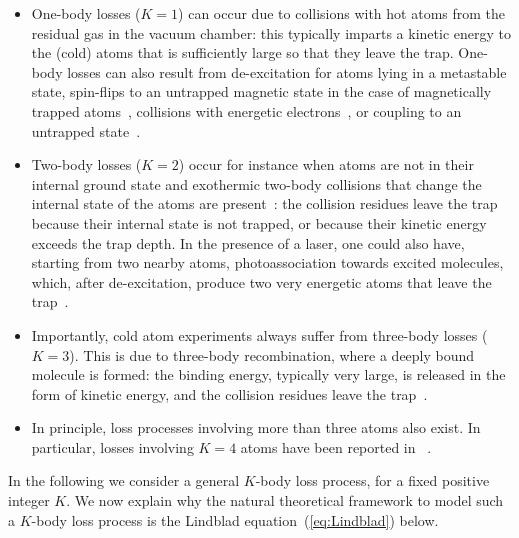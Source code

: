 \documentclass[onecolumn,amsfonts,showpacs,superscriptaddress]{revtex4-1}
\begin{document}
\begin{itemize}
\item One-body losses ($K=1$) can occur due to collisions with hot atoms from the residual gas in the vacuum chamber: this typically imparts a kinetic energy to the (cold) atoms that is sufficiently large so that they leave the trap.  
One-body losses can also result from de-excitation for atoms lying in a metastable state, spin-flips to an untrapped magnetic state in the case of magnetically trapped atoms~\citep{burrows_nonadiabatic_2017},
collisions with energetic electrons~\citep{labouvie_bistability_2016}, or 
coupling to an untrapped state~\citep{rauer_cooling_2016,bouchoule_asymptotic_2020}.


\item Two-body losses ($K=2$) occur for instance when atoms are not in their internal ground state and exothermic two-body collisions that change the internal state of the atoms are present~\citep{traverso_inelastic_2009,yamaguchi_inelastic_2008}: the collision residues leave the trap because their internal state is not trapped, or because their kinetic energy exceeds the trap depth. In the presence of a laser, one could also have, starting from two nearby atoms, photoassociation towards excited molecules, which, after de-excitation, produce two very energetic atoms that leave the trap~\citep{kinoshita_local_2005}.

\item Importantly, cold atom experiments always suffer from three-body losses ($K=3$). This is due to three-body recombination, where a 
deeply bound molecule is formed: the binding energy, typically very large, is released in the form of kinetic energy, and the collision residues leave the trap~\citep{soding_three-body_1999,tolra_observation_2004}. 

\item In principle, loss processes involving more than three atoms also exist. In particular, losses involving $K=4$ atoms have been reported in ~\citep{gurian_observation_2012,ferlaino_evidence_2009}.
\end{itemize}
In the following we consider a general $K$-body loss process, for a fixed positive integer $K$. We now explain why the natural theoretical framework to model such a $K$-body loss process is the Lindblad equation~(\ref{eq:Lindblad}) below.
\vspace{0.5cm}
\end{document}
